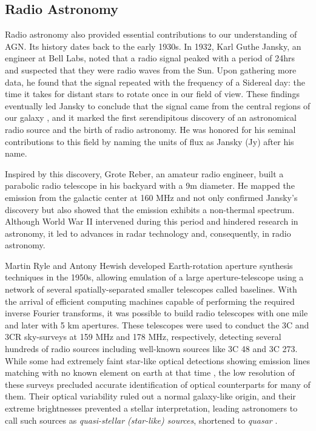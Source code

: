 \subsection{Radio Astronomy}
Radio astronomy also provided essential contributions to our understanding of AGN. Its history dates back to the early 1930s. In 1932, Karl Guthe Jansky, an engineer at Bell Labs, noted that a radio signal peaked with a period of 24hrs and suspected that they were radio waves from the Sun. Upon gathering more data, he found that the signal repeated with the frequency of a Sidereal day: the time it takes for distant stars to rotate once in our field of view. These findings eventually led Jansky to conclude that the signal came from the central regions of our galaxy \citep{jansky1932directional}, and it marked the first serendipitous discovery of an astronomical radio source and the birth of radio astronomy. He was honored for his seminal contributions to this field by naming the units of flux as Jansky (Jy) after his name.

Inspired by this discovery, Grote Reber, an amateur radio engineer, built a parabolic radio telescope in his backyard with a 9m diameter. He mapped the emission from the galactic center at 160 MHz and not only confirmed Jansky's discovery \citep{reber1940cosmic} but also showed that the emission exhibits a non-thermal spectrum. Although World War II intervened during this period and hindered research in astronomy, it led to advances in radar technology and, consequently, in radio astronomy. 

Martin Ryle and Antony Hewish developed Earth-rotation aperture synthesis techniques in the 1950s, allowing emulation of a large aperture-telescope using a network of several spatially-separated smaller telescopes called baselines. With the arrival of efficient computing machines capable of performing the required inverse Fourier transforms, it was possible to build radio telescopes with one mile and later with 5 km apertures. These telescopes 
were used to conduct the 3C and 3CR sky-surveys at 159 MHz and 178 MHz, respectively, detecting several hundreds of radio sources \citep{1959MmRAS..68...37E,10.1093/mnras/125.1.75} including well-known sources like 3C 48 and 3C 273. While some had extremely faint star-like optical detections showing emission lines matching with no known element on earth at that time \citep{1963ApJ...138...30M}, the low resolution of these surveys precluded accurate identification of optical counterparts for many of them. Their optical variability ruled out a normal galaxy-like origin, and their extreme brightnesses prevented a stellar interpretation, leading astronomers to call such sources as \textit{quasi-stellar (star-like) sources}, shortened to \textit{quasar} \citep{chiu1964gravitational}. 

